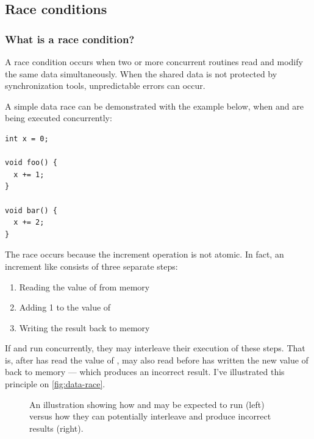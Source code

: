 \subsection{Race conditions}
\subsubsection{What is a race condition?}

A race condition occurs when two or more concurrent routines read and modify the same data simultaneously. When the shared data is not protected by synchronization tools, unpredictable errors can occur.

A simple data race can be demonstrated with the example below, when  and  are being executed concurrently:

\begin{verbatim}
int x = 0;

void foo() {
  x += 1;
}

void bar() {
  x += 2;
}
\end{verbatim}

The race occurs because the increment operation is not atomic. In fact, an increment like  consists of three separate steps:

\begin{enumerate}
  \item Reading the value of  from memory
  \item Adding 1 to the value of 
  \item Writing the result back to memory
\end{enumerate}

If  and  run concurrently, they may interleave their execution of these steps. That is, after  has read the value of ,  may also read  before  has written the new value of  back to memory --- which produces an incorrect result. I've illustrated this principle on \autoref{fig:data-race}.

\begin{figure}[H]
  \centering
  \hbox{}
  \caption{An illustration showing how  and  may be expected to run (left) versus how they can potentially interleave and produce incorrect results (right).}
  \label{fig:data-race}
\end{figure}

